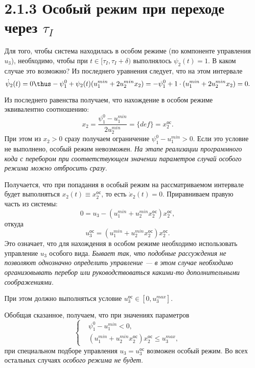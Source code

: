 \section*{2.1.3 Особый режим при переходе через $\tau_I$}
Для того, чтобы система находилась в особом режиме (по компоненте управления $u_3$), необходимо, чтобы при $t \in [\tau_I, \tau_I + \delta)$ выполнялось $\psi_2(t) = 1$. В каком случае это возможно? Из последнего уравнения следует, что на этом интервале
\begin{equation}\label{eq:nonlin_3_1}
    \dot{\psi}_2(t) = 0 \thus -\psi_1^0 + \psi_2(t) (u_1^{min} + 2 u_2^{min} x_2) = -\psi_1^0 + 1 \cdot (u_1^{min} + 2 u_2^{min} x_2) = 0.
\end{equation}

Из последнего равенства получаем, что нахождение в особом режиме эквивалентно соотношению:
$$
    x_2 = \frac{\psi_1^0 - u_1^{min}}{2 u_2^{min}} = \{ def \} = x_2^{\text{ос}}.
$$
При этом из $x_2 > 0$ сразу получаем ограничение $\psi_1^0 - u_1^{min} > 0$. Если это условие не выполнено, особый режим невозможен. \textit{На этапе реализации программного кода с перебором при соответствующем значении параметров случай особого режима можно отбросить сразу}.

Получается, что при попадания в особый режим на рассматриваемом интервале будет выполняться $x_2(t) \equiv x_2^{\text{ос}}$, то есть $\dot{x}_2(t) = 0$. Приравниваем правую часть из системы:
$$
    0 = u_3 - \left( u_1^{min} + u_2^{min} x_2^{\text{ос}} \right) x_2^{\text{ос}},
$$
откуда
$$
    u_3^{\text{ос}} = (u_1^{min} + u_2^{min} x_2^{\text{ос}}) x_2^{\text{ос}}.
$$
Это означает, что для нахождения в особом режиме необходимо использовать управление $u_3$ особого вида. \textit{Бывает так, что подобные рассуждения не позволяют однозначно определить управление --- в этом случае необходимо организовывать перебор или руководствоваться какими-то дополнительными соображениями.}

При этом должно выполняться условие $u_3^{\text{ос}} \in [0, u_3^{max}]$.

Обобщая сказанное, получаем, что при значениях параметров
$$
    \left\{
        \begin{aligned}
            & \psi_1^0 - u_1^{min} < 0, \\
            & (u_1^{min} + u_2^{min} x_2^{\text{ос}}) x_2^{\text{ос}} \leqslant u_3^{max},
        \end{aligned}
    \right.
$$
при специальном подборе управления $u_3 = u_3^{\text{ос}}$ возможен особый режим. Во всех остальных случаях \textit{особого режима не будет}.


